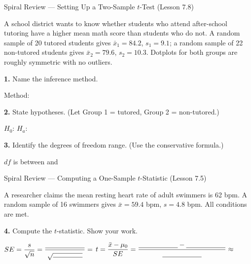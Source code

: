 \documentclass[10pt]{article}
\begin{document}
\namedateperiod

\vspace{0.1in}

\begin{notesbox}{Spiral Review --- Setting Up a Two-Sample $t$-Test (Lesson 7.8)}

A school district wants to know whether students who attend after-school tutoring have
a higher mean math score than students who do not. A random sample of 20 tutored students
gives $\bar x_1 = 84.2$, $s_1 = 9.1$; a random sample of 22 non-tutored students gives
$\bar x_2 = 79.6$, $s_2 = 10.3$. Dotplots for both groups are roughly symmetric with no outliers.

\textbf{1.} Name the inference method.

\quad Method: \blank{7cm}

\textbf{2.} State hypotheses. (Let Group 1 = tutored, Group 2 = non-tutored.)

\quad $H_0$: \blank{5cm} \quad $H_a$: \blank{5cm}

\textbf{3.} Identify the degrees of freedom range. (Use the conservative formula.)

\quad $df$ is between \blank{2cm} and \blank{2cm}

\end{notesbox}

\begin{notesbox}{Spiral Review --- Computing a One-Sample $t$-Statistic (Lesson 7.5)}

A researcher claims the mean resting heart rate of adult swimmers is 62 bpm.
A random sample of 16 swimmers gives $\bar x = 59.4$ bpm, $s = 4.8$ bpm.
All conditions are met.

\textbf{4.} Compute the $t$-statistic. Show your work.

\vspace{0.05in}
$SE = \dfrac{s}{\sqrt{n}} = \dfrac{\blank{2cm}}{\sqrt{\blank{1.5cm}}} = $ \blank{2cm}
\hfill
$t = \dfrac{\bar x - \mu_0}{SE} = \dfrac{\blank{2cm} - \blank{2cm}}{\blank{2cm}} \approx$ \blank{2cm}

\end{notesbox}
\end{document}
